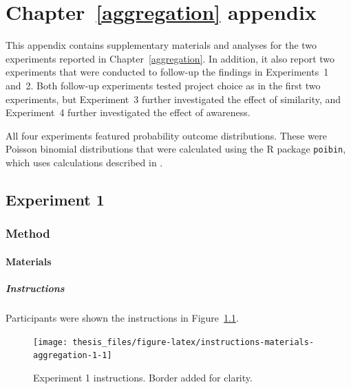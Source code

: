 \documentclass[a4paper, nobind, dvipsnames]{templates/ociamthesis}
\theoremstyle{definition}
\theoremstyle{definition}
\theoremstyle{definition}
\theoremstyle{definition}
\theoremstyle{remark}
\begin{document}
\newpage

\printbibliography[segment=\therefsegment,heading=subbibintoc]

\appendix


\hypertarget{aggregation-appendix}{%
\chapter{Chapter~\ref{aggregation} appendix}\label{aggregation-appendix}}

\minitoc

This appendix contains supplementary materials and analyses for the two
experiments reported in Chapter~\ref{aggregation}. In addition, it also report
two experiments that were conducted to follow-up the findings in Experiments~1
and~2. Both follow-up experiments tested project choice as in the first two
experiments, but Experiment~3 further investigated the effect of similarity, and
Experiment~4 further investigated the effect of awareness.

All four experiments featured probability outcome distributions. These were
Poisson binomial distributions that were calculated using the R package
\texttt{poibin}, which uses calculations described in \textcite{hong2013}.

\section{Experiment 1}

\subsection{Method}

\subsubsection{Materials}

\paragraph{Instructions}

Participants were shown the instructions in
Figure~\ref{fig:instructions-materials-aggregation-1}.



\begin{figure}
\texttt{[image: thesis\_files/figure-latex/instructions-materials-aggregation-1-1]} \caption{Experiment 1 instructions. Border added for clarity.}\label{fig:instructions-materials-aggregation-1}
\end{figure}
\end{document}
